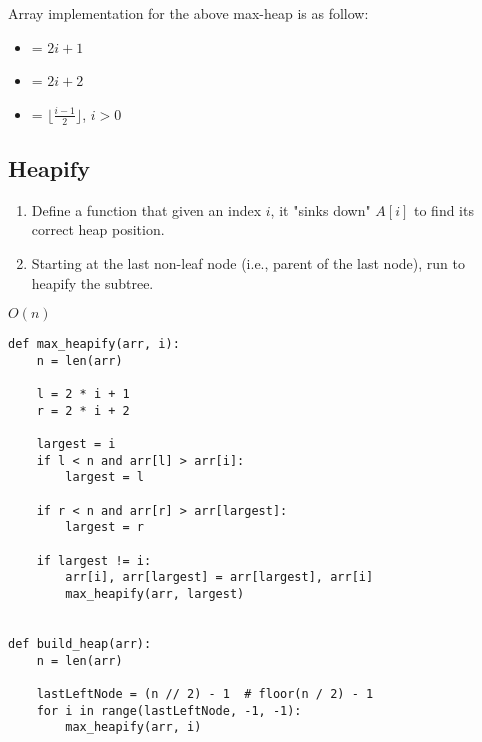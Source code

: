 Array implementation for the above max-heap is as follow:

\begin{itemize}
  \item {} = $2i + 1$
  \item {} = $2i + 2$
  \item {} = $\lfloor \frac{i - 1}{2} \rfloor$, $i > 0$
\end{itemize}

\subsection{Heapify}

\begin{enumerate}
  \item Define a function  that given an index $i$, it "sinks down" $A[i]$ to find its correct heap position.
  \item Starting at the last non-leaf node (i.e., parent of the last node), run  to heapify the subtree.
  
\end{enumerate}
$O(n)$

\begin{verbatim}
def max_heapify(arr, i):
    n = len(arr)

    l = 2 * i + 1
    r = 2 * i + 2

    largest = i
    if l < n and arr[l] > arr[i]:
        largest = l

    if r < n and arr[r] > arr[largest]:
        largest = r

    if largest != i:
        arr[i], arr[largest] = arr[largest], arr[i]
        max_heapify(arr, largest)


def build_heap(arr):
    n = len(arr)

    lastLeftNode = (n // 2) - 1  # floor(n / 2) - 1
    for i in range(lastLeftNode, -1, -1):
        max_heapify(arr, i)
\end{verbatim}

\noindent


